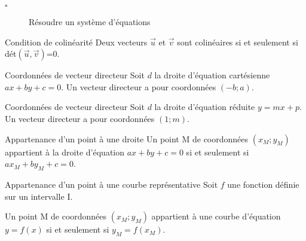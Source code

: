 \begin{titre}

\end{titre}

\begin{CpsCol}
\begin{description}
\item[$\square$] Résoudre un système d'équations
\end{description}
\end{CpsCol}






\begin{ThT}{Condition de colinéarité}
Deux vecteurs $\vec u$ et $\vec v$ sont colinéaires si et seulement si dét$\left( \vec u,\vec v \right)$=0.
\end{ThT}


\begin{ThT}{Coordonnées de vecteur directeur}
Soit $d$ la droite d'équation cartésienne $ax+by+c =0$. Un vecteur directeur a pour coordonnées $(-b;a)$.
\end{ThT}


\begin{ThT}{Coordonnées de vecteur directeur}
Soit $d$ la droite d'équation réduite $y = mx+p$. Un vecteur directeur a pour coordonnées $(1;m)$.
\end{ThT}



\begin{ThT}{Appartenance d'un point à une droite}
Un point M de coordonnées $(x_M;y_M)$ appartient à la droite d'équation $ax+by+c=0$ si et seulement si $ax_M+by_M+c=0$.
\end{ThT}


\begin{ThT}{Appartenance d'un point à une courbe représentative}
Soit $f$ une fonction définie sur un intervalle I.

Un point M de coordonnées $(x_M;y_M)$ appartient à une courbe d'équation $y=f(x)$ si et seulement si $y_M=f(x_M)$.
\end{ThT}




